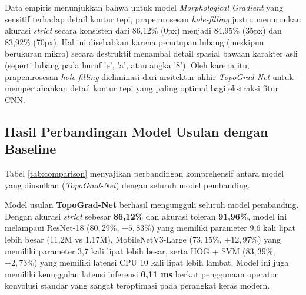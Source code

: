 \documentclass[journal]{IEEEtran}
\begin{document}
Data empiris menunjukkan bahwa untuk model \textit{Morphological Gradient} yang sensitif terhadap detail kontur tepi, prapemrosesan \textit{hole-filling} justru menurunkan akurasi \textit{strict} secara konsisten dari 86,12\% (0px) menjadi 84,95\% (35px) dan 83,92\% (70px). Hal ini disebabkan karena penutupan lubang (meskipun berukuran mikro) secara destruktif menambal detail spasial bawaan karakter asli (seperti lubang pada huruf 'e', 'a', atau angka '8'). Oleh karena itu, prapemrosesan \textit{hole-filling} dieliminasi dari arsitektur akhir \textit{TopoGrad-Net} untuk mempertahankan detail kontur tepi yang paling optimal bagi ekstraksi fitur CNN.

\subsection{Hasil Perbandingan Model Usulan dengan Baseline}
Tabel \ref{tab:comparison} menyajikan perbandingan komprehensif antara model yang diusulkan (\textit{TopoGrad-Net}) dengan seluruh model pembanding.

\begin{table}[htbp]
\caption{Perbandingan Performa Pengenalan Alphanumeric pada Chars74K}
\label{tab:comparison}
\begin{center}
\footnotesize
\setlength{\tabcolsep}{3pt}
\end{center}
\end{table}

Model usulan \textbf{TopoGrad-Net} berhasil mengungguli seluruh model pembanding. Dengan akurasi \textit{strict} sebesar \textbf{86,12\%} dan akurasi toleran \textbf{91,96\%}, model ini melampaui ResNet-18 ($80{,}29\%$, $+5{,}83\%$) yang memiliki parameter 9,6 kali lipat lebih besar (11,2M vs 1,17M), MobileNetV3-Large ($73{,}15\%$, $+12{,}97\%$) yang memiliki parameter 3,7 kali lipat lebih besar, serta HOG + SVM ($83{,}39\%$, $+2{,}73\%$) yang memiliki latensi CPU 10 kali lipat lebih lambat. Model ini juga memiliki keunggulan latensi inferensi \textbf{0,11 ms} berkat penggunaan operator konvolusi standar yang sangat teroptimasi pada perangkat keras modern.
\end{document}
